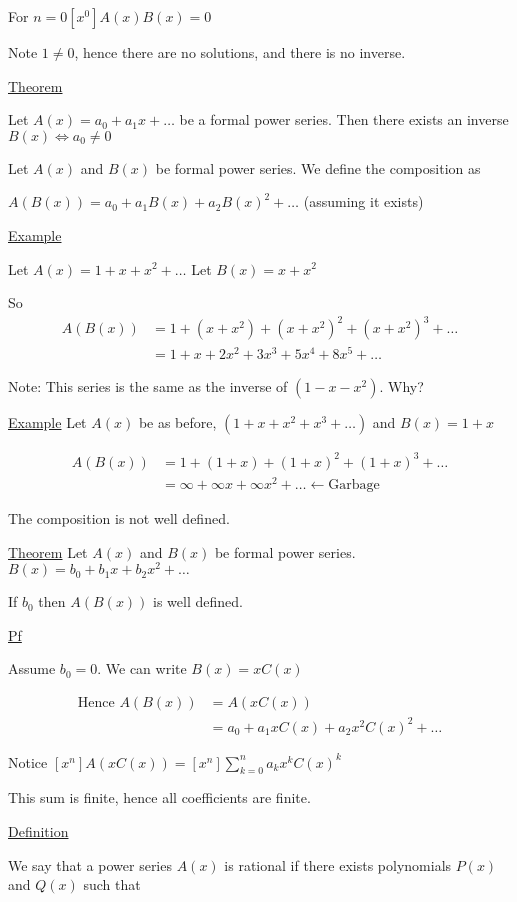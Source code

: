 \documentclass{article}
\begin{document}
For $n=0 [x^0]A(x)B(x)=0$

Note $1 \ne 0$, hence there are no solutions, and there is no inverse. 

\underline{Theorem}

Let $A(x) = a_0 + a_1x + \ldots$ be a formal power series. Then there exists an inverse $B(x) \iff a_0 \ne 0$

Let $A(x)$ and $B(x)$ be formal power series. We define the composition as 

$A(B(x)) = a_0 + a_1B(x) + a_2B(x)^2+\ldots$ (assuming it exists)

\underline{Example}

Let $A(x) = 1+x+x^2+\ldots$
Let $B(x) = x+x^2$

So 
\begin{align*}
A(B(x)) &= 1+(x+x^2)+(x+x^2)^2 + (x+x^2)^3+\ldots\\
&= 1+x+2x^2+3x^3+5x^4+8x^5+\ldots
\end{align*}

Note: This series is the same as the inverse of $(1-x-x^2)$. Why?

\underline{Example} Let $A(x)$ be as before, $(1+x+x^2+x^3+\ldots)$ and $B(x) = 1+x$

\begin{align*}
    A(B(x)) &= 1 + (1+x) + (1+x)^2 + (1+x)^3 + \ldots \\
    &= \infty + \infty x + \infty x^2 + \ldots \leftarrow \text{Garbage}
\end{align*}

The composition is not well defined. 

\underline{Theorem} Let $A(x)$ and $B(x)$ be formal power series. $B(x)=b_0+b_1x+b_2x^2+\ldots$

If $b_0$ then $A(B(x))$ is well defined. 

\underline{Pf}

Assume $b_0=0$. We can write $B(x)=xC(x)$

\begin{align*}
\text{Hence } A(B(x)) &= A(xC(x))\\
&= a_0 + a_1xC(x) + a_2x^2C(x)^2 + \ldots
\end{align*}

Notice $[x^n]A(xC(x)) = [x^n]\sum_{k=0}^{n}a_kx^kC(x)^k$

This sum is finite, hence all coefficients are finite. 

\underline{Definition}

We say that a power series $A(x)$ is rational if there exists polynomials $P(x)$ and $Q(x)$ such that
\end{document}
